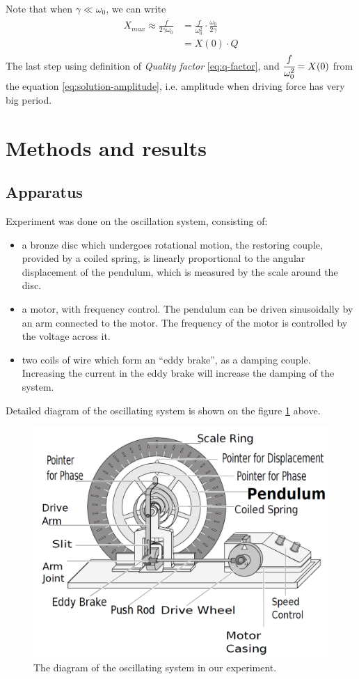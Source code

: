 \documentclass[12pt,a4paper]{article}
\begin{document}
	Note that when $\gamma \ll \omega_0$, we can write
	\begin{align}
	\begin{split}
	X_{max} \approx \frac{f}{2\gamma\omega_0} &= \frac{f}{\omega_0^2} \cdot \frac{\omega_0}{2\gamma}\\
	&=X(0) \cdot Q
	\end{split}
	\label{eq:alt-q-factor}
	\end{align}
	The last step using definition of \textit{Quality factor} \eqref{eq:q-factor}, and $\cfrac{f}{\omega_0^2} = X(0)$ from the \linebreak equation \ref{eq:solution-amplitude}, i.e. amplitude when driving force has very big period.
	
\section{Methods and results}\label{section:methods}
   	\subsection{Apparatus}
   	Experiment was done on the oscillation system, consisting of:
   	\begin{itemize}
   		\item a bronze disc which undergoes rotational motion, the restoring couple, provided by a coiled spring, is linearly proportional to the angular displacement of the pendulum, which is measured by the scale around the disc.
		\item a motor, with frequency control. The pendulum can be driven sinusoidally by an arm connected to the motor. The frequency of the motor is controlled by the voltage across it. 
		\item two coils of wire which form an “eddy brake”, as a damping couple. Increasing the current in the eddy brake will increase the damping of the system.
	\end{itemize}
	Detailed diagram of the oscillating system is shown on the figure \ref{fig:system-diagram} above.
	\begin{figure}[t]
		\centering
		\includegraphics[width=0.6\linewidth]{images/pendulum_diagram.png}
		\caption{The diagram of the oscillating system in our experiment.}
		\label{fig:system-diagram}
	\end{figure}
\end{document}
